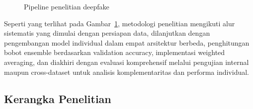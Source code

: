 \begin{figure}[H]
    \centering
    \caption{Pipeline penelitian deepfake}
    \label{fig:research_methodology}
\end{figure}

Seperti yang terlihat pada Gambar~\ref{fig:research_methodology}, metodologi penelitian mengikuti alur sistematis yang dimulai dengan persiapan data, dilanjutkan dengan pengembangan model individual dalam empat arsitektur berbeda, penghitungan bobot ensemble berdasarkan validation accuracy, implementasi weighted averaging, dan diakhiri dengan evaluasi komprehensif melalui pengujian internal maupun cross-dataset untuk analisis komplementaritas dan performa individual.

\subsection{Kerangka Penelitian}

